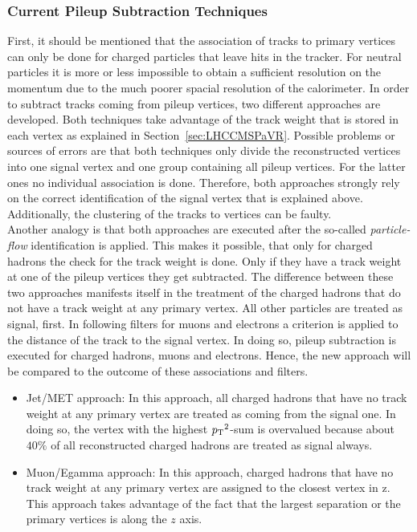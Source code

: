 \subsubsection{Current Pileup Subtraction Techniques \label{sec:IntroCurPST}}

First, it should be mentioned that the association of tracks to primary vertices can only be done for charged particles that leave hits in the tracker. For neutral particles it is more or less impossible to obtain a sufficient resolution on the momentum due to the much poorer spacial resolution of the calorimeter. In order to subtract tracks coming from pileup vertices, two different approaches are developed. Both techniques take advantage of the track weight that is stored in each vertex as explained in Section~\ref{sec:LHCCMSPaVR}. Possible problems or sources of errors are that both techniques only divide the reconstructed vertices into one signal vertex and one group containing all pileup vertices. For the latter ones no individual association is done. Therefore, both approaches strongly rely on the correct identification of the signal vertex that is explained above. Additionally, the clustering of the tracks to vertices can be faulty. \\
Another analogy is that both approaches are executed after the so-called \textit{particle-flow} identification is applied. This makes it possible, that only for charged hadrons  the check for the track weight is done.  Only if they have a track weight at one of the pileup vertices they get subtracted. The difference between these two approaches manifests itself in the treatment of the charged hadrons that do not have a track weight at any primary vertex. All other particles are treated as signal, first. In following filters for muons and electrons a criterion is applied to the distance of the track to the signal vertex. In doing so, pileup subtraction is executed for charged hadrons, muons and electrons. Hence, the new approach will be compared to the outcome of these associations and filters.

\begin{itemize}
    \item{Jet/MET approach:} In this approach, all charged hadrons that have no track weight at any primary vertex are treated as coming from the signal one. In doing so, the vertex with the highest $p_{\mathrm{T}}{}^{2}$-sum is overvalued because about $40\%$ of all reconstructed charged hadrons are treated as signal always.
    \item{Muon/Egamma approach:} In this approach, charged hadrons that have no track weight at any primary vertex are assigned to the closest vertex in z. This approach takes advantage of the fact that the largest separation or the primary vertices is along the $z$ axis.
\end{itemize}

